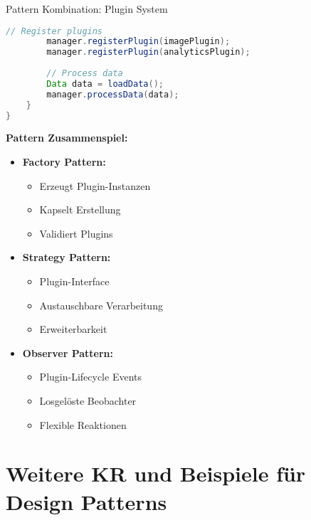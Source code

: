 \begin{example2}{Pattern Kombination: Plugin System}
\begin{lstlisting}[language=Java, style=basesmol]
        // Register plugins
        manager.registerPlugin(imagePlugin);
        manager.registerPlugin(analyticsPlugin);
        
        // Process data
        Data data = loadData();
        manager.processData(data);
    }
}
\end{lstlisting}

\textbf{Pattern Zusammenspiel:}
\begin{itemize}
    \item \textbf{Factory Pattern:}
    \begin{itemize}
        \item Erzeugt Plugin-Instanzen
        \item Kapselt Erstellung
        \item Validiert Plugins
    \end{itemize}
    
    \item \textbf{Strategy Pattern:}
    \begin{itemize}
        \item Plugin-Interface
        \item Austauschbare Verarbeitung
        \item Erweiterbarkeit
    \end{itemize}
    
    \item \textbf{Observer Pattern:}
    \begin{itemize}
        \item Plugin-Lifecycle Events
        \item Losgelöste Beobachter
        \item Flexible Reaktionen
    \end{itemize}
\end{itemize}
\end{example2}

\section{Weitere KR und Beispiele für Design Patterns}

